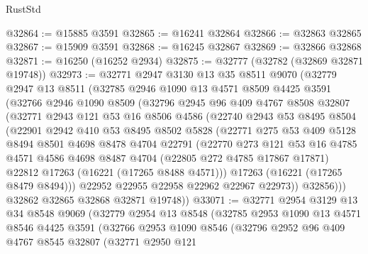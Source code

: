 \begin{lexlean}{RustStd}
\begin{coremodule}
@32864 := @15885 @3591
@32865 := @16241 @32864
@32866 := @32863 @32865
@32867 := @15909 @3591
@32868 := @16245 @32867
@32869 := @32866 @32868
@32871 := @16250 (@16252 @2934)
@32875 := @32777 (@32782 (@32869 @32871 @19748))
@32973 := @32771
    @2947
    @3130
    @13
    @35
    @8511
    @9070
    (@32779
      @2947
      @13
      @8511
      (@32785
        @2946
        @1090
        @13
        @4571
        @8509
        @4425
        @3591
        (@32766
          @2946
          @1090
          @8509
          (@32796
            @2945
            @96
            @409
            @4767
            @8508
            @32807
            (@32771
              @2943
              @121
              @53
              @16
              @8506
              @4586
              (@22740
                @2943
                @53
                @8495
                @8504
                (@22901
                  @2942
                  @410
                  @53
                  @8495
                  @8502
                  @5828
                  (@22771
                    @275
                    @53
                    @409
                    @5128
                    @8494
                    @8501
                    @4698
                    @8478
                    @4704
                    @22791
                    (@22770
                      @273
                      @121
                      @53
                      @16
                      @4785
                      @4571
                      @4586
                      @4698
                      @8487
                      @4704
                      (@22805 @272 @4785 @17867 @17871)
                      @22812
                      @17263
                      (@16221 (@17265 @8488 @4571)))
                    @17263
                    (@16221 (@17265 @8479 @8494)))
                  @22952
                  @22955
                  @22958
                  @22962
                  @22967
                  @22973))
              @32856)))
        @32862
        @32865
        @32868
        @32871
        @19748))
@33071 := @32771
    @2954
    @3129
    @13
    @34
    @8548
    @9069
    (@32779
      @2954
      @13
      @8548
      (@32785
        @2953
        @1090
        @13
        @4571
        @8546
        @4425
        @3591
        (@32766
          @2953
          @1090
          @8546
          (@32796
            @2952
            @96
            @409
            @4767
            @8545
            @32807
            (@32771
              @2950
              @121

\end{coremodule}
\end{lexlean}
